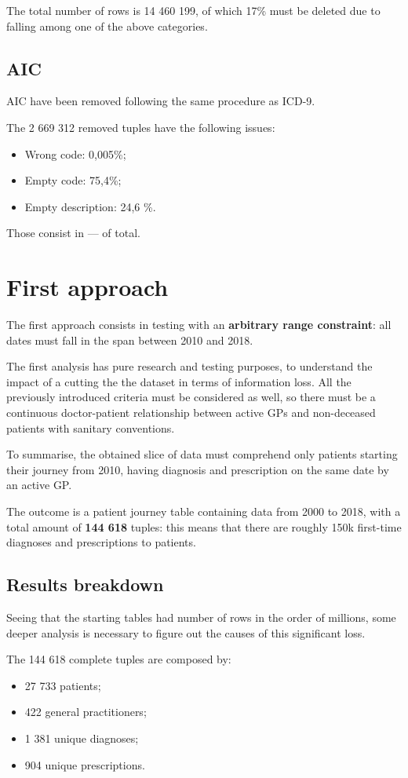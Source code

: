 The total number of rows is 14 460 199, of which 17\% must be deleted due to falling among one of the above categories.

\subsection{AIC}
AIC have been removed following the same procedure as ICD-9.

The 2 669 312 removed tuples have the following issues:
\begin{itemize}
	\item Wrong code: 0,005\%;
	\item Empty code: 75,4\%;
	\item Empty description: 24,6 \%.
\end{itemize}

Those consist in --- of total. %

\section{First approach}
The first approach consists in testing with an \textbf{arbitrary range constraint}: all dates must fall in the span between 2010 and 2018.

The first analysis has pure research and testing purposes, to understand the impact of a cutting the the dataset in terms of information loss. All the previously introduced criteria must be considered as well, so there must be a continuous doctor-patient relationship between active GPs and non-deceased patients with sanitary conventions.

To summarise, the obtained slice of data must comprehend only patients starting their journey from 2010, having diagnosis and prescription on the same date by an active GP.

The outcome is a patient journey table containing data from 2000 to 2018, with a total amount of \textbf{144 618} tuples: this means that there are roughly 150k first-time diagnoses and prescriptions to patients. 

\subsection{Results breakdown}
Seeing that the starting tables had number of rows in the order of millions, some deeper analysis is necessary to figure out the causes of this significant loss.

The 144 618 complete tuples are composed by:
\begin{itemize}
	\item 27 733 patients;
	\item 422 general practitioners;
	\item 1 381 unique diagnoses;
	\item 904 unique prescriptions.
\end{itemize}

